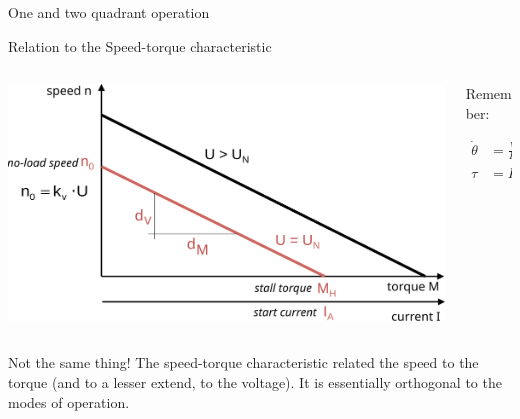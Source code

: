 \documentclass[compress]{beamer}
\begin{document}
{
    \begin{frame}{One and two quadrant operation}
    \end{frame}
}


\begin{frame}{Relation to the Speed-torque characteristic}

    \begin{columns}
        \begin{column}{0.7\linewidth}
    \begin{center}
        \includegraphics[width=\linewidth]{../part3/figs/voltage-torque}
    \end{center}


        \end{column}
        \begin{column}{0.3\linewidth}
            Remember:

    \begin{align*}
        \dot\theta &= \frac{V}{K} - R \cdot \frac{\tau}{K^2} \\
        \tau &= K \cdot I
    \end{align*}

        \end{column}
    \end{columns}

    \begin{center}
        Not the same thing! The speed-torque characteristic related the speed to
        the torque (and to a lesser extend, to the voltage). It is essentially orthogonal to
        the modes of operation.
    \end{center}

\end{frame}


\end{document}
